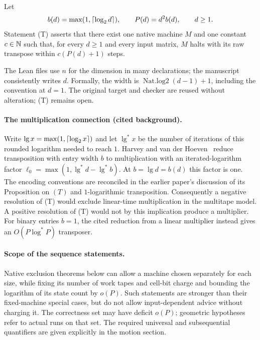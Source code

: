 \begin{definition}\label{def:target}
Let
\[
 b(d)=\max(1,\lceil\log_2d\rceil),\qquad P(d)=d^2b(d),\qquad d\ge1.
\]
Statement \textup{(T)} asserts that there exist one native machine $M$ and one
constant $c\in\mathbb N$ such that, for every $d\ge1$ and every input matrix,
$M$ halts with its raw transpose within $c(P(d)+1)$ steps.
\end{definition}

The Lean files use $n$ for the dimension in many declarations; the manuscript
consistently writes $d$. Formally, the width is
$\operatorname{Nat.log2}(d-1)+1$, including the convention at $d=1$.
The original target and checker are reused without alteration;
\textup{(T)} remains open.

\paragraph{The multiplication connection (cited background).}
Write $\lg x=\max(1,\lceil\log_2x\rceil)$ and let $\lg^*x$ be the number of
iterations of this rounded logarithm needed to reach $1$.
Harvey and van der Hoeven~\cite[Corollary~6.9]{HvdH2025} reduce transposition
with entry width $b$ to multiplication with an iterated-logarithm factor
$\ell_0=\max(1,\lg^*d-\lg^*b)$. At $b=\lg d=b(d)$ this factor is one.
The encoding conventions are reconciled in the earlier paper's discussion
of its Proposition on $(T)$ and $1$-logarithmic transposition.
Consequently a negative resolution of \textup{(T)} would exclude linear-time
multiplication in the multitape model. A positive resolution of \textup{(T)}
would not by this implication produce a multiplier. For binary entries
$b=1$, the cited reduction from a linear multiplier instead gives an
$O(P\log^*P)$ transposer.

\paragraph{Scope of the sequence statements.}
Native exclusion theorems below can allow a machine chosen separately for each
size, while fixing its number of work tapes and cell-bit charge and bounding
the logarithm of its state count by $o(P)$. Such statements are stronger than
their fixed-machine special cases, but do not allow input-dependent advice
without charging it. The correctness set may have deficit $o(P)$; geometric
hypotheses refer to actual runs on that set. The required universal and
subsequential quantifiers are given explicitly in the motion section.
